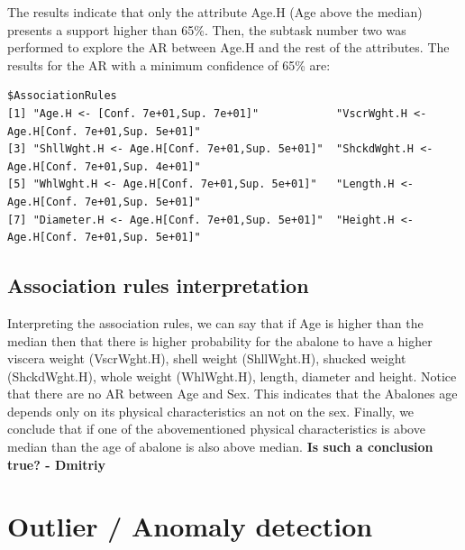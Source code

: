 \documentclass[10pt, paper=a4]{article}
\begin{document}
The results indicate that only the attribute Age.H (Age above the median)
presents a support higher than 65\%.  Then, the subtask number two was performed
to explore the AR between Age.H and the rest of the attributes.  The results for
the AR with a minimum confidence of 65\% are:
\begin{verbatim}
$AssociationRules
[1] "Age.H <- [Conf. 7e+01,Sup. 7e+01]"            "VscrWght.H <- Age.H[Conf. 7e+01,Sup. 5e+01]" 
[3] "ShllWght.H <- Age.H[Conf. 7e+01,Sup. 5e+01]"  "ShckdWght.H <- Age.H[Conf. 7e+01,Sup. 4e+01]"
[5] "WhlWght.H <- Age.H[Conf. 7e+01,Sup. 5e+01]"   "Length.H <- Age.H[Conf. 7e+01,Sup. 5e+01]"   
[7] "Diameter.H <- Age.H[Conf. 7e+01,Sup. 5e+01]"  "Height.H <- Age.H[Conf. 7e+01,Sup. 5e+01]"
\end{verbatim}

\subsection{Association rules interpretation}
Interpreting the association rules, we can say that if Age is higher than the
median then that there is higher probability for the abalone to have a higher
viscera weight (VscrWght.H), shell weight (ShllWght.H), shucked weight
(ShckdWght.H), whole weight (WhlWght.H), length, diameter and height.  Notice
that there are no AR between Age and Sex.  This indicates that the Abalones age
depends only on its physical characteristics an not on the sex.  {\color{red}
  Finally, we conclude that if one of the abovementioned physical
  characteristics is above median than the age of abalone is also above median.}
{\bf Is such a conclusion true? - Dmitriy}

\section{Outlier / Anomaly detection}
\label{sec:detection}

\end{document}
